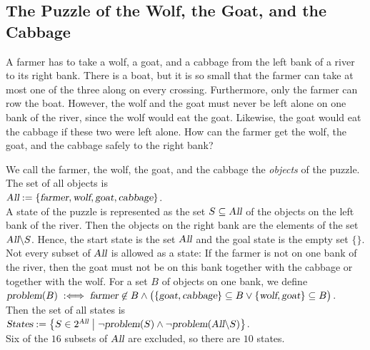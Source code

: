 \subsection{The Puzzle of the Wolf, the Goat, and the Cabbage}
A farmer has to take a wolf, a goat, and a cabbage from the left bank of a river to its right bank.  There is a
boat, but it is so small that the farmer can take at most one of the three along on every crossing.  Furthermore,
only the farmer can row the boat.  However, the wolf and the goat must never be left alone on one bank of the
river, since the wolf would eat the goat.  Likewise, the goat would eat the cabbage if these two were left alone.
How can the farmer get the wolf, the goat, and the cabbage safely to the right bank?

We call the farmer, the wolf, the goat, and the cabbage the \emph{objects} of the puzzle.  The set of all objects
is
\\[0.2cm]
\hspace*{1.3cm}
$\textsl{All} := \{ \textsl{farmer}, \textsl{wolf}, \textsl{goat}, \textsl{cabbage} \}$.
\\[0.2cm]
A state of the puzzle is represented as the set $S \subseteq \textsl{All}$ of the objects on the left bank of the
river.  Then the objects on the right bank are the elements of the set $\textsl{All} \backslash S$.  Hence, the
start state is the set $\textsl{All}$ and the goal state is the empty set $\{\}$.  Not every subset of
$\textsl{All}$ is allowed as a state:  If the farmer is not on one bank of the river, then the goat must not be on
this bank together with the cabbage or together with the wolf.  For a set $B$ of objects on one bank, we define
\\[0.2cm]
\hspace*{1.3cm}
$\textsl{problem}(B) \;:\Longleftrightarrow\; \textsl{farmer} \not\in B \wedge
 \bigl( \{ \textsl{goat}, \textsl{cabbage} \} \subseteq B \vee \{ \textsl{wolf}, \textsl{goat} \} \subseteq B \bigr)$.
\\[0.2cm]
Then the set of all states is
\\[0.2cm]
\hspace*{1.3cm}
$\textsl{States} := \bigl\{ S \in 2^{\textsl{All}} \bigm| \neg \textsl{problem}(S) \wedge
 \neg \textsl{problem}(\textsl{All} \backslash S) \bigr\}$.
\\[0.2cm]
Six of the $16$ subsets of $\textsl{All}$ are excluded, so there are $10$ states.

